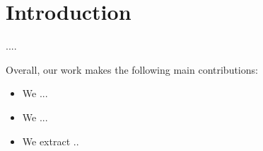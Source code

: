 \section{Introduction}

....


Overall, our work makes the following main contributions:

\begin{itemize}

\item We ...

\item We ...

\item We extract ..


\end{itemize}

